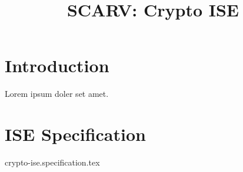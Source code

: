 \documentclass{article}
\title{SCARV: Crypto ISE}
\begin{document}
\maketitle
\tableofcontents

\section{Introduction}

Lorem ipsum doler set amet.

\section{ISE Specification}
{crypto-ise.specification.tex}


\printbibliography
\end{document}
